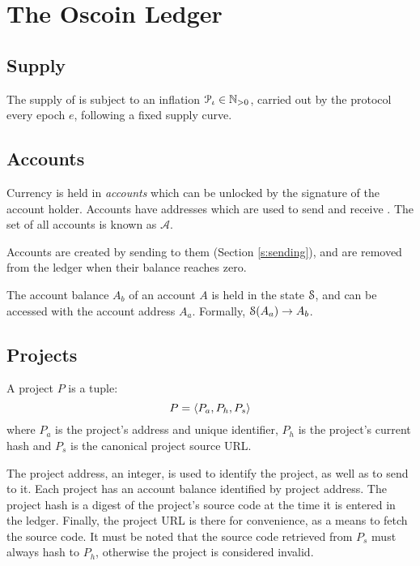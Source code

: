 \section{The Oscoin Ledger}
\label{s:ledger}


\subsection{Supply}

The supply of \oscoin{} is subject to an inflation $\mathcal{P}_{\iota} \in
\mathbb{N}_{>0}$, carried out by the protocol every epoch $e$, following a
fixed supply curve.

\subsection{Accounts}
\label{s:accounts}


Currency is held in \emph{accounts} which can be unlocked by the signature of
the account holder. Accounts have addresses which are used to send and receive
\oscoin{}. The set of all accounts is known as $\mathcal{A}$.

Accounts are created by sending \oscoin{} to them (Section \ref{s:sending}),
and are removed from the ledger when their balance reaches zero.

The account balance $A_b$ of an account $A$ is held in the state $\mathcal{S}$, and
can be accessed with the account address $A_a$. Formally, $\mathcal{S}(A_a) \to A_b$.

\subsection{Projects}
\label{s:projects}

A project $P$ is a tuple:
\[
    P = \langle P_a, P_h, P_s\rangle
\]
where $P_{a}$ is the project's address and unique identifier, $P_h$ is
the project's current hash and $P_s$ is the canonical project source
URL.

The project address, an integer, is used to identify the project, as
well as to send \oscoin{} to it. Each project has an account balance
identified by project address. The project hash is a digest of the
project's source code at the time it is entered in the
ledger. Finally, the project URL is there for convenience, as a means
to fetch the source code.  It must be noted that the source code
retrieved from $P_s$ must always hash to $P_h$, otherwise the project
is considered invalid.

